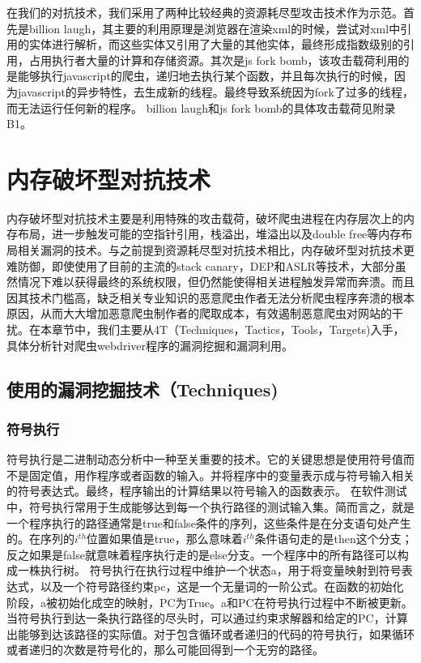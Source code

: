 \documentclass[doctor,privacy,twoside]{buaa_mac}
\begin{document}
在我们的对抗技术，我们采用了两种比较经典的资源耗尽型攻击技术作为示范。首先是billion laugh，其主要的利用原理是浏览器在渲染xml的时候，尝试对xml中引用的实体进行解析，而这些实体又引用了大量的其他实体，最终形成指数级别的引用，占用执行者大量的计算和存储资源。其次是js fork bomb，该攻击载荷利用的是能够执行javascript的爬虫，递归地去执行某个函数，并且每次执行的时候，因为javascript的异步特性，去生成新的线程。最终导致系统因为fork了过多的线程，而无法运行任何新的程序。 billion laugh和js fork bomb的具体攻击载荷见附录B1。


\section{内存破坏型对抗技术}
内存破坏型对抗技术主要是利用特殊的攻击载荷，破坏爬虫进程在内存层次上的内存布局，进一步触发可能的空指针引用，栈溢出，堆溢出以及double free等内存布局相关漏洞的技术。与之前提到资源耗尽型对抗技术相比，内存破坏型对抗技术更难防御，即使使用了目前的主流的stack canary，DEP和ASLR等技术，大部分虽然情况下难以获得最终的系统权限，但仍然能使得相关进程触发异常而奔溃。而且因其技术门槛高，缺乏相关专业知识的恶意爬虫作者无法分析爬虫程序奔溃的根本原因，从而大大增加恶意爬虫制作者的爬取成本，有效遏制恶意爬虫对网站的干扰。在本章节中，我们主要从4T（Techniques，Tactics，Tools，Targets)入手，具体分析针对爬虫webdriver程序的漏洞挖掘和漏洞利用。

\subsection{使用的漏洞挖掘技术（Techniques)}

\subsubsection{符号执行}
符号执行是二进制动态分析中一种至关重要的技术。它的关键思想是使用符号值而不是固定值，用作程序或者函数的输入。并将程序中的变量表示成与符号输入相关的符号表达式。最终，程序输出的计算结果以符号输入的函数表示。
在软件测试中，符号执行常用于生成能够达到每一个执行路径的测试输入集。简而言之，就是一个程序执行的路径通常是true和false条件的序列，这些条件是在分支语句处产生的。在序列的$i^{th}$位置如果值是true，那么意味着$i^{th}$条件语句走的是then这个分支；反之如果是false就意味着程序执行走的是else分支。一个程序中的所有路径可以构成一株执行树。
符号执行在执行过程中维护一个状态a，用于将变量映射到符号表达式，以及一个符号路径约束pc，这是一个无量词的一阶公式。在函数的初始化阶段，a被初始化成空的映射，PC为True。a和PC在符号执行过程中不断被更新。当符号执行到达一条执行路径的尽头时，可以通过约束求解器和给定的PC，计算出能够到达该路径的实际值。对于包含循环或者递归的代码的符号执行，如果循环或者递归的次数是符号化的，那么可能回得到一个无穷的路径。 
\end{document}
